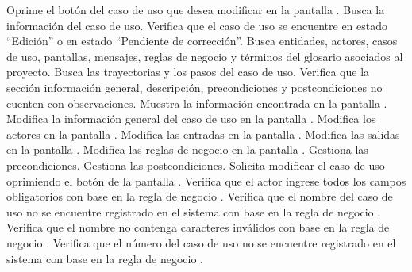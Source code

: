  \begin{UCtrayectoria}
    \UCpaso[\UCactor] Oprime el botón \btnEditar del caso de uso que desea modificar en la pantalla .
    \UCpaso[\UCsist] Busca la información del caso de uso.
	\UCpaso[\UCsist] Verifica que el caso de uso se encuentre en estado ``Edición'' o en estado ``Pendiente de corrección''.
	\UCpaso[\UCsist] Busca entidades, actores, casos de uso, pantallas, mensajes, reglas de negocio y términos del glosario asociados al proyecto.
	\UCpaso[\UCsist] Busca las trayectorias y los pasos del caso de uso.
	\UCpaso[\UCsist] Verifica que la sección información general, descripción, precondiciones y postcondiciones no cuenten con observaciones. 
    \UCpaso[\UCsist] Muestra la información encontrada en la pantalla . \label{cu5.2:muestraPantalla} 
    \UCpaso[\UCactor] Modifica la información general del caso de uso en la pantalla . \label{cu5.2:ingresaDatos}
    \UCpaso[\UCactor] Modifica los actores en la pantalla .  \label{cu5.2:ingresaActores}
    \UCpaso[\UCactor] Modifica las entradas en la pantalla .   \label{cu5.2:ingresaEntradas}
    \UCpaso[\UCactor] Modifica las salidas en la pantalla .    \label{cu5.2:ingresaSalidas}
    \UCpaso[\UCactor] Modifica las reglas de negocio en la pantalla .  \label{cu5.2:ingresaReglasNegocio}
    \UCpaso[\UCactor] Gestiona las precondiciones.\label{cu5.2:ingresaPrecond}
    \UCpaso[\UCactor] Gestiona las postcondiciones.\label{cu5.2:ingresaPostcond}
    \UCpaso[\UCactor] Solicita modificar el caso de uso oprimiendo el botón  de la pantalla . 
    \UCpaso[\UCsist] Verifica que el actor ingrese todos los campos obligatorios con base en la regla de negocio  . 
    \UCpaso[\UCsist] Verifica que el nombre del caso de uso no se encuentre registrado en el sistema con base en la regla de negocio  . 
    \UCpaso[\UCsist] Verifica que el nombre no contenga caracteres inválidos con base en la regla de negocio . 
    \UCpaso[\UCsist] Verifica que el número del caso de uso no se encuentre registrado en el sistema con base en la regla de negocio  . 

\end{UCtrayectoria}
